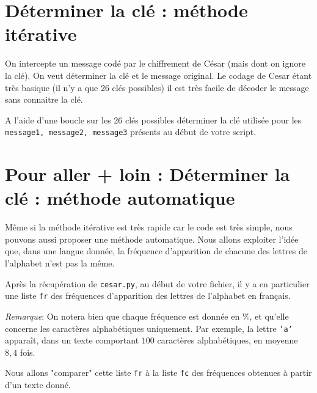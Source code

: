\section*{Déterminer la clé : méthode itérative}
On intercepte un message codé par le chiffrement de César (mais dont on ignore la clé). On veut déterminer la clé et le message original. 
Le codage de Cesar étant très basique (il n'y a que 26 clés possibles) il est très facile de décoder le message sans connaitre la clé.\\

\begin{question}
A l'aide d'une boucle sur les 26 clés possibles déterminer la clé utilisée pour les \texttt{message1, message2, message3} présents au début de votre script.
\end{question}


\section*{Pour aller + loin : Déterminer la clé : méthode automatique}

Même si la méthode itérative est très rapide car le code est très simple, nous pouvons aussi proposer une méthode automatique.
Nous allons exploiter l'idée que, dans une langue donnée, la fréquence d'apparition de chacune des lettres de l'alphabet n'est pas la même. 

Après la récupération de \texttt{cesar.py}, au début de votre fichier, il y a en particulier une liste \texttt{fr} des fréquences d'apparition %
des lettres de l'alphabet en français.

\emph{Remarque}: On notera bien que chaque fréquence est donnée en \%, et  qu'elle concerne les caractères alphabétiques uniquement. Par exemple, la lettre \texttt{'a'} apparaît, dans un texte comportant  $100$ caractères alphabétiques, en moyenne $8,4$ fois.

Nous allons "comparer" cette liste \texttt{fr} à la liste \texttt{fc} des fréquences obtenues à partir d'un texte donné.


